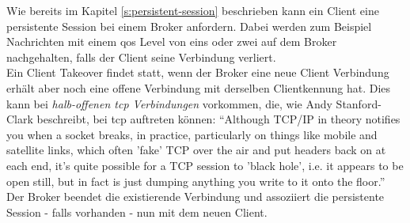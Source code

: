  \label{s:client-takeover}
Wie bereits im Kapitel \ref{s:persistent-session} beschrieben kann ein Client eine persistente Session bei einem Broker anfordern. Dabei werden zum Beispiel Nachrichten mit einem \ac{qos} Level von eins oder zwei auf dem Broker nachgehalten, falls der Client seine Verbindung verliert.
\\
Ein Client Takeover findet statt, wenn der Broker eine neue Client Verbindung erhält aber noch eine offene Verbindung mit derselben Clientkennung hat. Dies kann bei \textit{halb-offenen \acs{tcp} Verbindungen} vorkommen, die, wie Andy Stanford-Clark beschreibt, bei \ac{tcp} auftreten können:\newline
``Although TCP/IP in theory notifies you when a socket breaks, in practice, particularly on things like mobile and satellite links, which often 'fake' TCP over the air and put headers back on at each end, it’s quite possible for a TCP session to 'black hole', i.e. it appears to be open still, but in fact is just dumping anything you write to it onto the floor.''\cite{WhyKeepaliveNeeded}\newline
Der Broker beendet die existierende Verbindung und assoziiert die persistente Session - falls vorhanden - nun mit dem neuen Client.
\cite{teamKeepAliveClient}
\newpage

